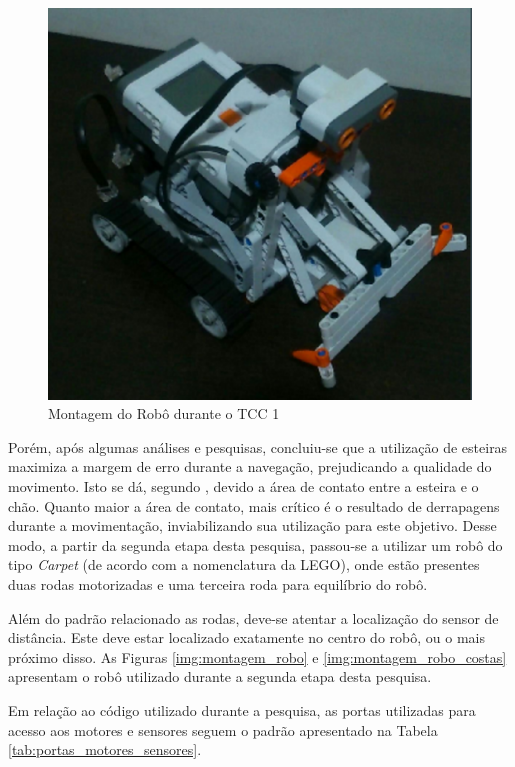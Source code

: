	\begin{figure}[H]
		\centering
		\includegraphics[scale=0.3]{figuras/montagem_antiga.eps}
		\caption[Montagem do Robô 1]{Montagem do Robô durante o TCC 1}
		\label{img:montagem_antiga}
	\end{figure}

	Porém, após algumas análises e pesquisas, concluiu-se que a utilização de esteiras maximiza a margem de erro durante a navegação, prejudicando a qualidade do movimento. Isto se dá, segundo \cite{legonxj}, devido a área de contato entre a esteira e o chão. Quanto maior a área de contato, mais crítico é o resultado de derrapagens durante a movimentação, inviabilizando sua utilização para este objetivo. Desse modo, a partir da segunda etapa desta pesquisa, passou-se a utilizar um robô do tipo \textit{Carpet} (de acordo com a nomenclatura da LEGO), onde estão presentes duas rodas motorizadas e uma terceira roda para equilíbrio do robô.

	Além do padrão relacionado as rodas, deve-se atentar a localização do sensor de distância. Este deve estar localizado exatamente no centro do robô, ou o mais próximo disso. As Figuras \ref{img:montagem_robo}  e \ref{img:montagem_robo_costas} apresentam o robô utilizado durante a segunda etapa desta pesquisa.

	Em relação ao código utilizado durante a pesquisa, as portas utilizadas para acesso aos motores e sensores seguem o padrão apresentado na Tabela \ref{tab:portas_motores_sensores}.

